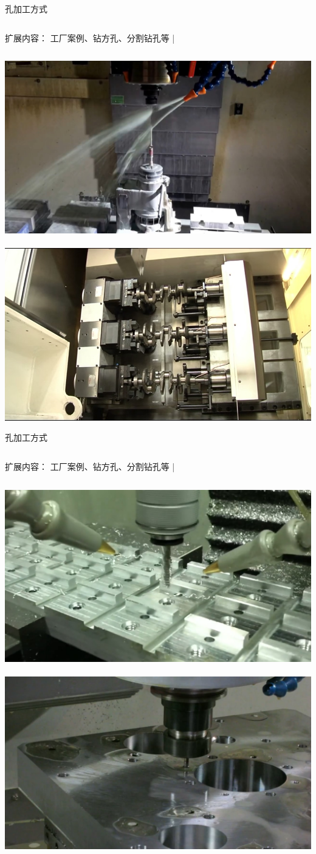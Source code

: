 \documentclass[utf8,zihao=-4,handout,smaller,aspectratio=1610]{ctexbeamer}
\begin{document}
\begin{frame}{孔加工方式}
	\begin{columns}
		\begin{block}{扩展内容：}
			工厂案例、钻方孔、分割钻孔等
			|\end{block}
	\end{columns}
	
	\vspace{25pt}
	
	\includegraphics[width=0.5\linewidth,trim=0 0 0 0,clip,angle=0]{image/shengkong.jpg}~
	\includegraphics[width=0.5\linewidth,trim=0 0 0 0,clip,angle=0]{image/qubing.jpg}
	
\end{frame}

\begin{frame}{孔加工方式}
	\begin{columns}
		\column{.05\textwidth}
		\column{.6\textwidth}
		\begin{block}{扩展内容：}
			工厂案例、钻方孔、分割钻孔等
			|\end{block}
		\column{.0\textwidth}
	\end{columns}
	
	\vspace{25pt}
	
	\includegraphics[width=0.5\linewidth,trim=0 0 0 0,clip,angle=0]{image/canpingshili.jpg}~
	\includegraphics[width=0.5\linewidth,trim=0 0 0 0,clip,angle=0]{image/3}
	
\end{frame}
\end{document}
